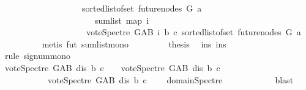 \begin{isabellebody}
\ \ \ \ \ \ \ \ \ \ \ \ \ \ \ \ \ \ \ {\isacharparenleft}{\kern0pt}sorted{\isacharunderscore}{\kern0pt}list{\isacharunderscore}{\kern0pt}of{\isacharunderscore}{\kern0pt}set\ {\isacharparenleft}{\kern0pt}future{\isacharunderscore}{\kern0pt}nodes\ G\ a{\isacharparenright}{\kern0pt}{\isacharparenright}{\kern0pt}{\isacharparenright}{\kern0pt}\ \isanewline
\ \ \ \ \ \ \ \ \ \ \ \ \ \ \ \ \ \ \ \ {\isasymle}\ \ sum{\isacharunderscore}{\kern0pt}list\ {\isacharparenleft}{\kern0pt}map\ {\isacharparenleft}{\kern0pt}{\isasymlambda}i{\isachardot}{\kern0pt}\isanewline
\ \ \ \ \ \ \ \ \ \ \ \ \ \ \ \ \ \ \ \ {\isacharparenleft}{\kern0pt}vote{\isacharunderscore}{\kern0pt}Spectre\ G{\isacharunderscore}{\kern0pt}AB\ i\ b\ c{\isacharparenright}{\kern0pt}{\isacharparenright}{\kern0pt}\ {\isacharparenleft}{\kern0pt}sorted{\isacharunderscore}{\kern0pt}list{\isacharunderscore}{\kern0pt}of{\isacharunderscore}{\kern0pt}set\ {\isacharparenleft}{\kern0pt}future{\isacharunderscore}{\kern0pt}nodes\ G\ a{\isacharparenright}{\kern0pt}{\isacharparenright}{\kern0pt}{\isacharparenright}{\kern0pt}{\isachardoublequoteclose}\isanewline
\ \ \ \ \ \ \ \ \isamarkupfalse%
\ {\isacharparenleft}{\kern0pt}metis\ fut\ sum{\isacharunderscore}{\kern0pt}list{\isacharunderscore}{\kern0pt}mono\ {\isacharparenright}{\kern0pt}\isanewline
\ \ \ \ \ \ \isamarkupfalse%
\ {\isacharquery}{\kern0pt}thesis\ \isamarkupfalse%
\ ins\ ins{}\isanewline
\ \ \ \ \ \ \isamarkupfalse%
\ {\isacharparenleft}{\kern0pt}rule\ signum{\isacharunderscore}{\kern0pt}mono{\isacharparenright}{\kern0pt}\isanewline
\ \ \ \ \ \ \ \ \isamarkupfalse%
\ {\isachardoublequoteopen}vote{\isacharunderscore}{\kern0pt}Spectre\ G{\isacharunderscore}{\kern0pt}AB\ dis\ b\ c\ {\isacharequal}{\kern0pt}\ {}{\isachardoublequoteclose}\ {\isacharbar}{\kern0pt}\ {\isachardoublequoteopen}vote{\isacharunderscore}{\kern0pt}Spectre\ G{\isacharunderscore}{\kern0pt}AB\ dis\ b\ c\ {\isacharequal}{\kern0pt}\ {}{\isachardoublequoteclose}\ \isanewline
\ \ \ \ \ \ \ \ \ \ {\isacharbar}{\kern0pt}\ {\isachardoublequoteopen}vote{\isacharunderscore}{\kern0pt}Spectre\ G{\isacharunderscore}{\kern0pt}AB\ dis\ b\ c\ {\isacharequal}{\kern0pt}\ {\isacharminus}{\kern0pt}{}{\isachardoublequoteclose}\ \isamarkupfalse%
\ domain{\isacharunderscore}{\kern0pt}Spectre\isanewline
\ \ \ \ \ \ \ \ \ \ \isamarkupfalse%
\ blast\ \isanewline
\ \ \ \ \ \ \ \ \isamarkupfalse%
\ \isamarkupfalse%

\end{isabellebody}
